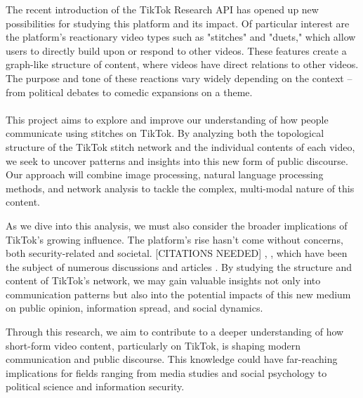 The recent introduction of the TikTok Research API \citep{tiktokresearchapi} has opened up new possibilities for studying this platform and its impact. Of particular interest are the platform's reactionary video types such as "stitches" and "duets," which allow users to directly build upon or respond to other videos. These features create a graph-like structure of content, where videos have direct relations to other videos. The purpose and tone of these reactions vary widely depending on the context – from political debates to comedic expansions on a theme.\\\\
This project aims to explore and improve our understanding of how people communicate using stitches on TikTok. By analyzing both the topological structure of the TikTok stitch network and the individual contents of each video, we seek to uncover patterns and insights into this new form of public discourse. Our approach will combine image processing, natural language processing methods, and network analysis to tackle the complex, multi-modal nature of this content.

As we dive into this analysis, we must also consider the broader implications of TikTok's growing influence. The platform's rise hasn't come without concerns, both security-related and societal.  [CITATIONS NEEDED] \citep{tiktok_alcohol_good}, \citep{covidFakeNewsTikTok}, which have been the subject of numerous discussions and articles \citep{security_tiktok, security_tiktok2, security_tiktok3, security_tiktok4}. By studying the structure and content of TikTok's network, we may gain valuable insights not only into communication patterns but also into the potential impacts of this new medium on public opinion, information spread, and social dynamics.

Through this research, we aim to contribute to a deeper understanding of how short-form video content, particularly on TikTok, is shaping modern communication and public discourse. This knowledge could have far-reaching implications for fields ranging from media studies and social psychology to political science and information security.





